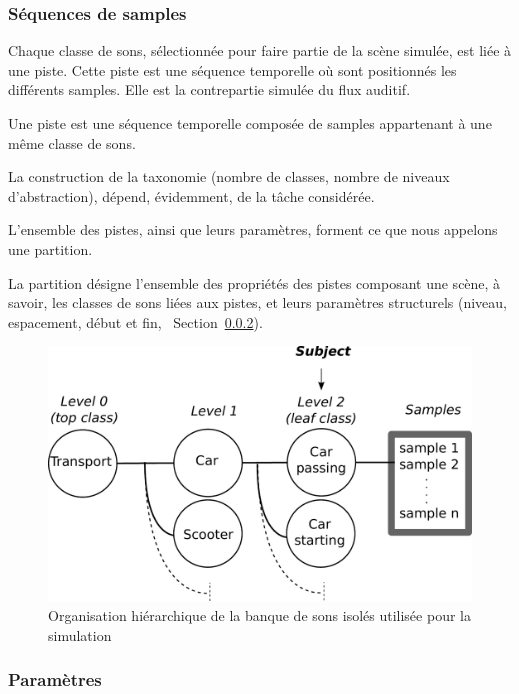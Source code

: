 \subsubsection{Séquences de samples}
\label{sec:ch4_seqSample}

Chaque classe de sons, sélectionnée pour faire partie de la scène simulée, est liée à une piste. Cette piste est une séquence temporelle où sont positionnés les différents samples. Elle est la contrepartie simulée du flux auditif.

\begin{mydef}
Une piste est une séquence temporelle composée de samples appartenant à une même classe de sons.
\end{mydef}

La construction de la taxonomie (nombre de classes, nombre de niveaux d'abstraction), dépend, évidemment, de la tâche considérée. 

L'ensemble des pistes, ainsi que leurs paramètres, forment ce que nous appelons une partition.

\begin{mydef}
La partition désigne l'ensemble des propriétés des pistes composant une scène, à savoir, les classes de sons liées aux pistes, et leurs paramètres structurels (niveau, espacement, début et fin, \cf~Section~\ref{sec:ch4_modelParam}).
\end{mydef}

\begin{figure}[t]
        \myfloatalign
        \includegraphics[width=.8\linewidth]{gfx/3}
       \caption{Organisation hiérarchique de la banque de sons isolés utilisée pour la simulation}\label{fig:orgDb}
\end{figure}

\subsubsection{Paramètres}
\label{sec:ch4_modelParam}


